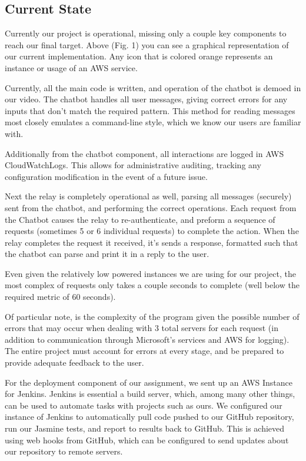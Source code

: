 \documentclass[onecolumn, draftclsnofoot,10pt, compsoc]{IEEEtran}
\begin{document}
\subsection{Current State}
Currently our project is operational, missing only a couple key components to reach our final target.
Above (Fig. 1) you can see a graphical representation of our current implementation.
Any icon that is colored orange represents an instance or usage of an AWS service.

Currently, all the main code is written, and operation of the chatbot is demoed in our video.
The chatbot handles all user messages, giving correct errors for any inputs that don't match the required pattern.
This method for reading messages most closely emulates a command-line style, which we know our users are familiar with.

Additionally from the chatbot component, all interactions are logged in AWS CloudWatchLogs.
This allows for administrative auditing, tracking any configuration modification in the event of a future issue.

Next the relay is completely operational as well, parsing all messages (securely) sent from the chatbot, and performing the correct operations.
Each request from the Chatbot causes the relay to re-authenticate, and preform a sequence of requests (sometimes 5 or 6 individual requests) to complete the action.
When the relay completes the request it received, it's sends a response, formatted such that the chatbot can parse and print it in a reply to the user.

Even given the relatively low powered instances we are using for our project, the most complex of requests only takes a couple seconds to complete (well below the required metric of 60 seconds).

Of particular note, is the complexity of the program given the possible number of errors that may occur when dealing with 3 total servers for each request (in addition to communication through Microsoft's services and AWS for logging).
The entire project must account for errors at every stage, and be prepared to provide adequate feedback to the user.

For the deployment component of our assignment, we sent up an AWS Instance for Jenkins.
Jenkins is essential a build server, which, among many other things, can be used to automate tasks with projects such as ours.
We configured our instance of Jenkins to automatically pull code pushed to our GitHub repository, run our Jasmine tests, and report to results back to GitHub.
This is achieved using web hooks from GitHub, which can be configured to send updates about our repository to remote servers.
\end{document}
